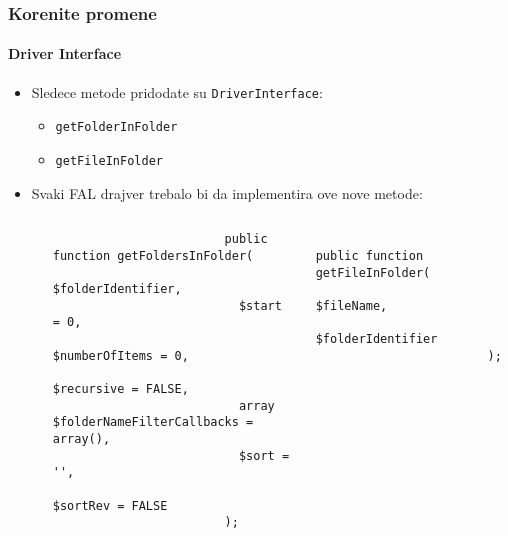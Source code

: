 \begin{frame}[fragile]
	\frametitle{Korenite promene}
	\framesubtitle{Driver Interface}

	\lstset{basicstyle=\tiny\ttfamily}

	\begin{itemize}

		\item Sledece metode pridodate su \texttt{DriverInterface}:

			\begin{itemize}
				\item \texttt{getFolderInFolder}
				\item \texttt{getFileInFolder}
			\end{itemize}

		\item Svaki FAL drajver trebalo bi da implementira ove nove metode:

			\begin{columns}[T]
				\begin{column}{.07\textwidth}
                \end{column}
				\begin{column}{.465\textwidth}

					\begin{lstlisting}
						public function getFoldersInFolder(
						  $folderIdentifier,
						  $start = 0,
						  $numberOfItems = 0,
						  $recursive = FALSE,
						  array $folderNameFilterCallbacks = array(),
						  $sort = '',
						  $sortRev = FALSE
						);
					\end{lstlisting}

                \end{column}
				\begin{column}{.465\textwidth}

					\begin{lstlisting}
						public function getFileInFolder(
						  $fileName,
						  $folderIdentifier
						);
					\end{lstlisting}

				\end{column}
			\end{columns}

	\end{itemize}

	\breakingchange

\end{frame}


